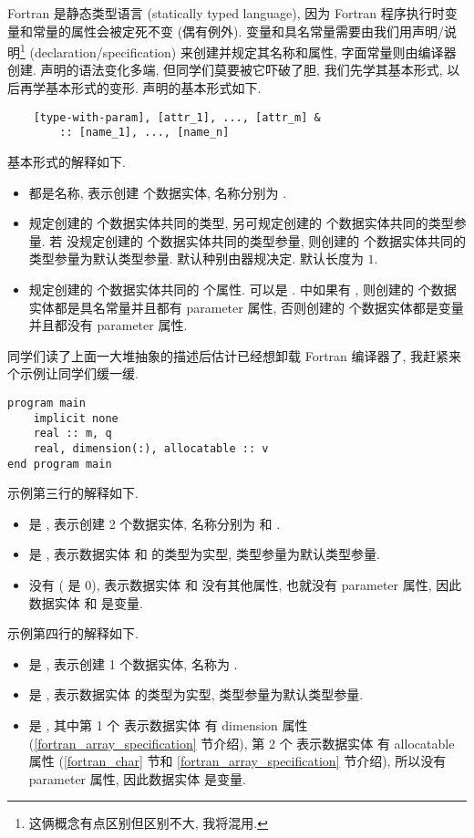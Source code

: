 Fortran 是静态类型语言 (statically typed language), 因为 Fortran 程序执行时变量和常量的属性会被定死不变 (偶有例外). 变量和具名常量需要由我们用声明/说明\footnote{这俩概念有点区别但区别不大, 我将混用.} (declaration/specification) 来创建并规定其名称和属性, 字面常量则由编译器创建. 声明的语法变化多端, 但同学们莫要被它吓破了胆, 我们先学其基本形式, 以后再学基本形式的变形. 声明的基本形式如下.
\begin{lstlisting}
    [type-with-param], [attr_1], ..., [attr_m] &
        :: [name_1], ..., [name_n]
\end{lstlisting}
基本形式的解释如下.
\begin{itemize}
    \item {} 都是名称, 表示创建  个数据实体, 名称分别为 .
    \item {} 规定创建的  个数据实体共同的类型, 另可规定创建的  个数据实体共同的类型参量. 若  没规定创建的  个数据实体共同的类型参量, 则创建的  个数据实体共同的类型参量为默认类型参量. 默认种别由器规决定. 默认长度为 $1$.
    \item {} 规定创建的  个数据实体共同的  个属性.  可以是 .  中如果有 , 则创建的  个数据实体都是具名常量并且都有 parameter 属性, 否则创建的  个数据实体都是变量并且都没有 parameter 属性.
\end{itemize}
同学们读了上面一大堆抽象的描述后估计已经想卸载 Fortran 编译器了, 我赶紧来个示例让同学们缓一缓. 
\begin{lstlisting}
program main
    implicit none
    real :: m, q
    real, dimension(:), allocatable :: v
end program main
\end{lstlisting}
示例第三行的解释如下.
\begin{itemize}
    \item {} 是 , 表示创建 2 个数据实体, 名称分别为  和 .
    \item {} 是 , 表示数据实体  和  的类型为实型, 类型参量为默认类型参量.
    \item {} 没有 ( 是 0), 表示数据实体  和  没有其他属性, 也就没有 parameter 属性, 因此数据实体  和 是变量.
\end{itemize}
示例第四行的解释如下.
\begin{itemize}
    \item {} 是 , 表示创建 1 个数据实体, 名称为 .
    \item {} 是 , 表示数据实体  的类型为实型, 类型参量为默认类型参量.
    \item {} 是 , 其中第 1 个  表示数据实体  有 dimension 属性 (\ref{fortran_array_specification} 节介绍), 第 2 个  表示数据实体  有 allocatable 属性 (\ref{fortran_char} 节和 \ref{fortran_array_specification} 节介绍), 所以没有 parameter 属性, 因此数据实体  是变量.
\end{itemize}

